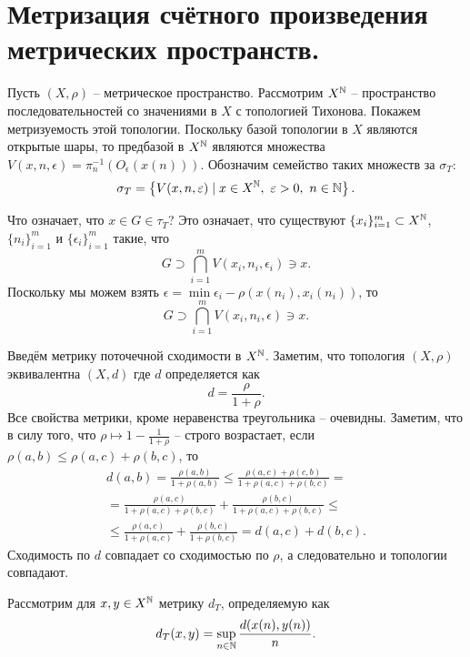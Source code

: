 \section{Метризация счётного произведения метрических пространств.}
\begin{example}
    Пусть $(X, \rho)$ -- метрическое пространство.
    Рассмотрим $X^{\mathbb{N}}$ -- пространство последовательностей со значениями в $X$ с топологией Тихонова.
    Покажем метризуемость этой топологии.
    Поскольку базой топологии в $X$ являются открытые шары, то предбазой в $X^{\mathbb{N}}$ являются множества $V(x, n, \epsilon) = \pi^{-1}_n(O_\epsilon(x(n)))$.
    Обозначим семейство таких множеств за $\sigma_T\colon$
    \[
        \sigma_T = \left\{V(x, n, \varepsilon) \mid x \in X^{\mathbb{N}}, \ \varepsilon > 0, \ n \in \mathbb{N} \right\}.
    \]

    Что означает, что $x \in G \in \tau_T$?
    Это означает, что существуют $\{x_i\}_{i = 1}^{m} \subset X^{\mathbb{N}}$, $\{n_i\}_{i = 1}^{m}$ и $\{\epsilon_i\}_{i = 1}^{m}$ такие, что
    \[
        G \supset \bigcap_{i = 1}^{m} V(x_i, n_i, \epsilon_i) \ni x.
    \]
    Поскольку мы можем взять $\epsilon = \min \epsilon_i - \rho(x(n_i), x_i(n_i))$, то
    \[
        G \supset \bigcap_{i = 1}^{m} V(x_i, n_i, \epsilon) \ni x.
    \]

    Введём метрику поточечной сходимости в $X^{\mathbb{N}}$.
    Заметим, что топология $(X, \rho)$ эквивалентна $(X, d)$ где $d$ определяется как
    \[
        d = \frac{\rho}{1 + \rho}.
    \]
    Все свойства метрики, кроме неравенства треугольника -- очевидны.
    Заметим, что в силу того, что $\rho \mapsto 1 - \frac{1}{1 + \rho}$ -- строго возрастает, если $\rho(a, b) \leq \rho(a, c) + \rho(b, c)$, то
    \begin{multline*}
        d(a, b) = \frac{\rho(a, b)}{1 + \rho(a, b)} \leq \frac{\rho(a, c) + \rho(c, b)}{1 + \rho(a, c) + \rho(b, c)} = \\ = \frac{\rho(a, c)}{1 + \rho(a, c) + \rho(b, c)} + \frac{\rho(b, c)}{1 + \rho(a, c) + \rho(b, c)} \leq \\ \leq \frac{\rho(a, c)}{1 + \rho(a, c)} + \frac{\rho(b, c)}{1 + \rho(b, c)} = d(a, c) + d(b, c).
    \end{multline*}
    Сходимость по $d$ совпадает со сходимостью по $\rho$, а следовательно и топологии совпадают. %

    Рассмотрим для $x, y \in X^{\mathbb{N}}$ метрику $d_T$, определяемую как
    \[
        d_T(x, y) = \sup_{n \in \mathbb{N}} \frac{d(x(n), y(n))}{n}.
    \]


\end{example}
